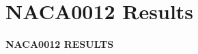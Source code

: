 \section[NACA0012]{\textbf{NACA0012 Results}}


\begin{frame}[plain]
    \centering
    \vfill

    {\LARGE\bfseries NACA0012 RESULTS}

    \vfill
\end{frame}


